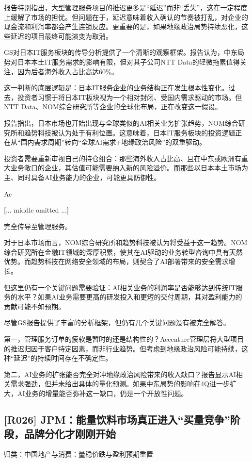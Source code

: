 \documentclass[11pt]{ctexart}
\begin{document}
报告特别指出，大型管理服务项目的推迟更多是“延迟”而非“丢失”，这在一定程度上缓解了市场的担忧。但问题在于，延迟意味着收入确认的节奏被打乱，对企业的现金流和利润率都会产生连锁反应。更重要的是，如果地缘政治局势持续恶化，这些延迟的项目最终可能演变为取消。

GS对日本IT服务板块的传导分析提供了一个清晰的观察框架。报告认为，中东局势对日本本土IT服务需求的影响有限，但对其子公司NTT Data的轻微拖累值得关注，因为后者海外收入占比高达60\%。

这一判断的底层逻辑是：日本IT服务企业的业务结构正在发生根本性变化。过去，投资者习惯于将日本IT板块视为一个相对封闭、受国内需求驱动的市场。但NTT Data、NOM综合研究所等企业的全球化布局，正在改变这一假设。

报告指出，日本市场也开始出现与全球类似的AI相关业务扩张趋势，NOM综合研究所和趋势科技被认为处于有利位置。这意味着，日本IT服务板块的投资逻辑正在从“国内需求周期”转向“全球AI需求+地缘政治风险”的双重驱动。

投资者需要重新审视自己的持仓组合：那些海外收入占比高、且在中东或欧洲有重大业务敞口的企业，其估值可能需要纳入新的风险溢价。而那些以日本本土市场为主、同时具备AI业务能力的企业，可能更具防御性。

Ac

[... middle omitted ...]

完全传导至管理服务。

对于日本市场而言，NOM综合研究所和趋势科技被认为将受益于这一趋势。NOM综合研究所在金融IT领域的深厚积累，使其在AI驱动的业务转型咨询中具有天然优势。而趋势科技在网络安全领域的布局，则契合了AI部署带来的安全需求增长。

但这里仍有一个关键问题需要验证：AI相关业务的利润率是否能够达到传统IT服务的水平？如果AI业务需要更高的研发投入和更短的交付周期，其对盈利能力的贡献可能不如预期。

尽管GS报告提供了丰富的分析框架，但仍有几个关键问题没有被完全解答。

第一，管理服务订单的疲软是暂时的还是结构性的？Accenture管理层将大型项目的推迟归因于客户特定因素，而非行业趋势。但考虑到地缘政治风险可能持续，这种“延迟”的持续时间存在不确定性。

第二，AI业务的扩张能否完全对冲地缘政治风险带来的收入缺口？报告显示AI相关需求强劲，但并未给出具体的量化预测。如果中东局势的影响在4Q进一步扩大，AI业务的增量能否弥补这一缺口，仍是一个开放性问题。

\subsection{[R026] JPM：能量饮料市场真正进入“买量竞争”阶段，品牌分化才刚刚开始}
{\small\color{refgray}归类：中国地产与消费：量稳价跌与盈利预期重置}
\end{document}
